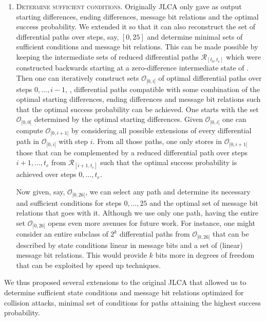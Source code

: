 \begin{enumerate}
\item \textsc{Determine sufficient conditions.} Originally JLCA only gave as output starting differences, ending differences, message bit relations and the optimal success probability. 
We extended it so that it can also reconstruct the set of differential paths over steps, say, $[0,25]$ and determine minimal sets of sufficient conditions and message bit relations.
This can be made possible by keeping the intermediate sets of reduced differential paths $\mathcal{R}_{[t_b,t_e]}$ which were constructed backwards starting at a zero-difference intermediate state of \shaone.
Then one can iteratively construct sets $\mathcal{O}_{[0,i[}$ of optimal differential paths over steps $0,\ldots,i-1$, \ie,
differential paths compatible with some combination of the optimal starting differences, ending differences and message bit relations such that the optimal success probability can be achieved.
One starts with the set $\mathcal{O}_{[0,0[}$ determined by the optimal starting differences.
Given $\mathcal{O}_{[0,i[}$ one can compute $\mathcal{O}_{[0,i+1[}$ by considering
all possible extensions of every differential path in $\mathcal{O}_{[0,i[}$ with step $i$.
From all those paths, one only stores in $\mathcal{O}_{[0,i+1[}$ those that can be complemented by a reduced differential path over steps $i+1,\ldots,t_e$ from $\mathcal{R}_{[i+1,t_e]}$ such that the optimal success probability is achieved over steps $0,\ldots,t_e$.

Now given, say, $\mathcal{O}_{[0,26[}$, we can select any path and determine its necessary and sufficient conditions for steps $0,\ldots,25$ and the optimal set of message bit relations that goes with it.
Although we use only one path, having the entire set $\mathcal{O}_{[0,26[}$ opens even more avenues for future work.
For instance, one might consider an entire subclass of $2^k$ differential paths from $\mathcal{O}_{[0,26[}$ that can be described by state conditions linear in message bits and a set of (linear) message bit relations.
This would provide $k$ bits more in degrees of freedom that can be exploited by speed up techniques.
\end{enumerate}
We thus proposed several extensions to the original JLCA that allowed us to determine sufficient state conditions and message bit relations optimized for collision attacks,
\ie minimal set of conditions for paths attaining the highest success probability.

